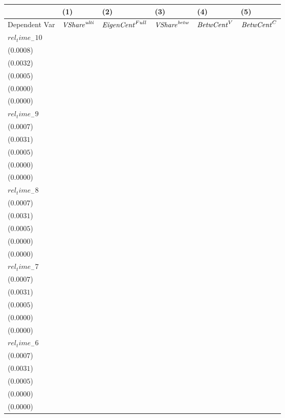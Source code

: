 \begin{tabular}{llllll}
\toprule
{} &                                      (1) &                                      (2) &                                      (3) &                                      (4) &                                      (5) \\
\midrule
Dependent Var       &                ${\it VShare}^{\it ulti}$ &                 ${\it EigenCent}^{Full}$ &                ${\it VShare}^{\it betw}$ &                       ${\it BetwCent}^V$ &                       ${\it BetwCent}^C$ \\
$rel_time_-10$      &  \makecell{$0.0025^{***}$ \\ ($0.0008$)} &  \makecell{$0.0086^{***}$ \\ ($0.0032$)} &  \makecell{$0.0042^{***}$ \\ ($0.0005$)} &  \makecell{$0.0003^{***}$ \\ ($0.0000$)} &  \makecell{$0.0001^{***}$ \\ ($0.0000$)} \\
$rel_time_-9$       &     \makecell{$0.0005^{}$ \\ ($0.0007$)} &     \makecell{$0.0010^{}$ \\ ($0.0031$)} &  \makecell{$0.0039^{***}$ \\ ($0.0005$)} &  \makecell{$0.0003^{***}$ \\ ($0.0000$)} &  \makecell{$0.0001^{***}$ \\ ($0.0000$)} \\
$rel_time_-8$       &    \makecell{$-0.0008^{}$ \\ ($0.0007$)} &   \makecell{$-0.0060^{*}$ \\ ($0.0031$)} &  \makecell{$0.0032^{***}$ \\ ($0.0005$)} &  \makecell{$0.0002^{***}$ \\ ($0.0000$)} &  \makecell{$0.0001^{***}$ \\ ($0.0000$)} \\
$rel_time_-7$       &     \makecell{$0.0006^{}$ \\ ($0.0007$)} &     \makecell{$0.0010^{}$ \\ ($0.0031$)} &  \makecell{$0.0035^{***}$ \\ ($0.0005$)} &  \makecell{$0.0003^{***}$ \\ ($0.0000$)} &  \makecell{$0.0001^{***}$ \\ ($0.0000$)} \\
$rel_time_-6$       &     \makecell{$0.0000^{}$ \\ ($0.0007$)} &    \makecell{$-0.0017^{}$ \\ ($0.0031$)} &  \makecell{$0.0053^{***}$ \\ ($0.0005$)} &  \makecell{$0.0004^{***}$ \\ ($0.0000$)} &  \makecell{$0.0002^{***}$ \\ ($0.0000$)} \\

\end{tabular}
